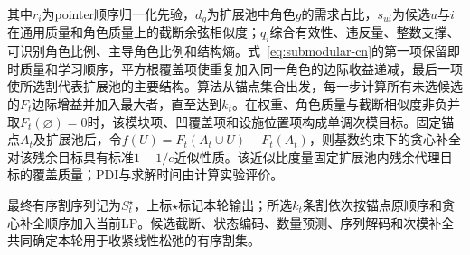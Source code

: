 \documentclass[final,5p,times,twocolumn]{elsarticle}
\begin{document}
其中$r_i$为pointer顺序归一化先验，$d_g$为扩展池中角色$g$的需求占比，$s_{ui}$为候选$u$与$i$在通用质量和角色质量上的截断余弦相似度；$q_i$综合有效性、违反量、整数支撑、可识别角色比例、主导角色比例和结构熵。式~\eqref{eq:submodular-cn}的第一项保留即时质量和学习顺序，平方根覆盖项使重复加入同一角色的边际收益递减，最后一项使所选割代表扩展池的主要结构。算法从锚点集合出发，每一步计算所有未选候选的$F_t$边际增益并加入最大者，直至达到$k_t$。在权重、角色质量与截断相似度非负并取$F_t(\varnothing)=0$时，该模块项、凹覆盖项和设施位置项构成单调次模目标。固定锚点$A_t$及扩展池后，令$f(U)=F_t(A_t\cup U)-F_t(A_t)$，则基数约束下的贪心补全对该残余目标具有标准$1-1/e$近似性质\citep{nemhauser1978analysis}。该近似比度量固定扩展池内残余代理目标的覆盖质量；PDI与求解时间由计算实验评价。

最终有序割序列记为$S_t^\star$，上标$\star$标记本轮输出；所选$k_t$条割依次按锚点原顺序和贪心补全顺序加入当前LP。候选截断、状态编码、数量预测、序列解码和次模补全共同确定本轮用于收紧线性松弛的有序割集。
\end{document}
